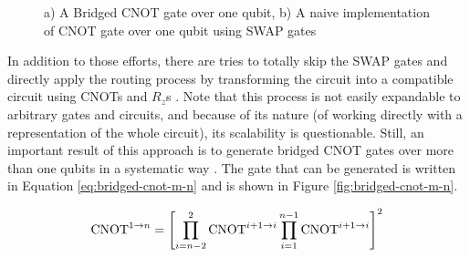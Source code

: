 \begin{figure}[h]
  \label{fig:bridged-cnot-1}
  \centering
  \caption{a) A Bridged CNOT gate over one qubit, b) A naive implementation of CNOT gate over one qubit using SWAP gates}
\end{figure}

In addition to those efforts, there are tries to totally skip the SWAP gates and directly apply the routing process by transforming the circuit into a compatible circuit using CNOTs and $R_z$s \cite{nash2020,kissinger2019}. Note that this process is not easily expandable to arbitrary gates and circuits, and because of its nature (of working directly with a representation of the whole circuit), its scalability is questionable. Still, an important result of this approach is to generate bridged CNOT gates over more than one qubits in a systematic way \cite{nash2020}. The gate that can be generated is written in Equation \ref{eq:bridged-cnot-m-n} and is shown in Figure \ref{fig:bridged-cnot-m-n}.

\begin{equation} 
  \label{eq:bridged-cnot-m-n}
  \operatorname{CNOT}^{1\to n} = \qty[\prod_{i=n - 2}^{2}\operatorname{CNOT}^{i + 1\to i} \prod_{i=1}^{n - 1}\operatorname{CNOT}^{i + 1\to i}]^2
\end{equation}

